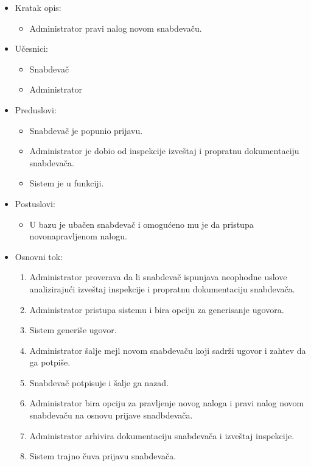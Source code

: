 
\begin{itemize}
	\item Kratak opis:
		\begin{itemize}
			\item Administrator pravi nalog novom snabdevaču.
		\end{itemize}
	\item Učesnici:
		\begin{itemize}
			\item Snabdevač
			\item Administrator
		\end{itemize}				
	\item Preduslovi:
		\begin{itemize}
		    \item Snabdevač je popunio prijavu.
		    \item Administrator je dobio od inspekcije izveštaj i propratnu dokumentaciju snabdevača. %
		    \item Sistem je u funkciji.
		\end{itemize}
	\item Postuslovi:
		\begin{itemize}
			\item U bazu je ubačen snabdevač i omogućeno mu je da pristupa novonapravljenom nalogu.
		\end{itemize}		
	\item Osnovni tok:
		\begin{enumerate}
		    \item Administrator proverava da li snabdevač ispunjava neophodne uslove analizirajući izveštaj inspekcije i propratnu dokumentaciju snabdevača.
		    \item Administrator pristupa sistemu i bira opciju za generisanje ugovora. 
		    \item Sistem generiše ugovor.
		    \item Administrator šalje mejl novom snabdevaču koji sadrži ugovor i zahtev da ga potpiše.
		    \item Snabdevač potpisuje i šalje ga nazad.
		    \item Administrator bira opciju za pravljenje novog naloga i pravi nalog novom snabdevaču na osnovu prijave snadbdevača.
		    \item Administrator arhivira dokumentaciju snabdevača i izveštaj inspekcije.
		    \item Sistem trajno čuva prijavu snabdevača.

\end{enumerate}
\end{itemize}
